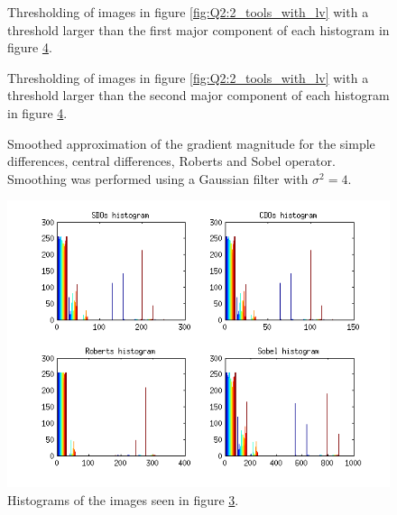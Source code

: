 \begin{figure}[H]
	\centering
	\scalebox{0.9}{}
	\caption{Thresholding of images in figure \ref{fig:Q2:2_tools_with_lv} with a threshold larger than the first major component of 
	each histogram in figure \ref{fig:Q2:histogram_tools_with_lv}.}
	\label{fig:Q2:threshold_tools_1_with_lv}
\end{figure}

\begin{figure}[H]
	\centering
	\scalebox{0.9}{}
	\caption{Thresholding of images in figure \ref{fig:Q2:2_tools_with_lv} with a threshold larger than the second major component of 
	each histogram in figure \ref{fig:Q2:histogram_tools_with_lv}.}
	\label{fig:Q2:threshold_tools_2_with_lv}
\end{figure}


\begin{figure}[H]
	\centering
	\scalebox{0.7}{}
	\caption{Smoothed approximation of the gradient magnitude for the simple differences, central differences, Roberts and Sobel operator. Smoothing
	was performed using a Gaussian filter with $\sigma^2 = 4$.}
	\label{fig:Q2:2_tools_smoothed_with_lv}
\end{figure}

\begin{figure}[H]
	\centering
	\includegraphics[scale=0.8]{./images/Q2/with_lv/tools_smoothed/histogram_1.png}
	\caption{Histograms of the images seen in figure \ref{fig:Q2:2_tools_smoothed_with_lv}.}
	\label{fig:Q2:histogram_tools_with_lv}
\end{figure}


